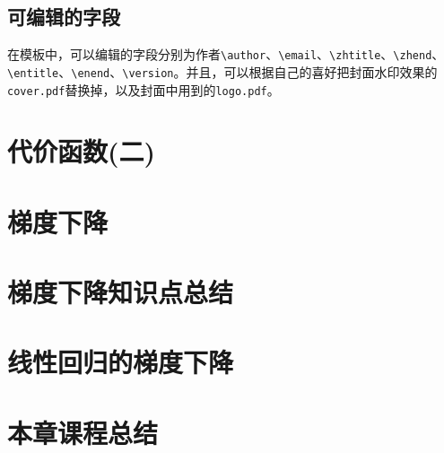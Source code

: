 \subsection{可编辑的字段}
在模板中，可以编辑的字段分别为作者\verb|\author|、\verb|\email|、\verb|\zhtitle|、\verb|\zhend|、\verb|\entitle|、\verb|\enend|、\verb|\version|。并且，可以根据自己的喜好把封面水印效果的\verb|cover.pdf|替换掉，以及封面中用到的\verb|logo.pdf|。

\section{代价函数(二)}

\section{梯度下降}

\section{梯度下降知识点总结}

\section{线性回归的梯度下降}

\section{本章课程总结}